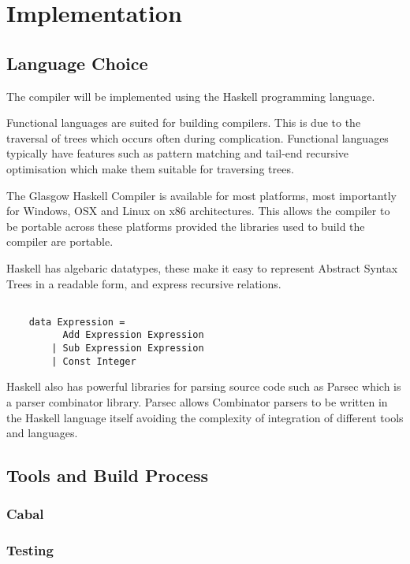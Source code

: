\chapter{Implementation}


\section{Language Choice}

The compiler will be implemented using the Haskell programming language.

Functional languages are suited for building compilers.
This is due to the traversal of trees which occurs often during complication.
Functional languages typically have features such as pattern matching and tail-end recursive optimisation 
which make them suitable for traversing trees.

The Glasgow Haskell Compiler is available for most platforms, most importantly for Windows, OSX and Linux 
on x86 architectures. This allows the compiler to be portable across these platforms provided the libraries 
used to build the compiler are portable.

Haskell has algebaric datatypes, these make it easy to represent Abstract Syntax Trees in a 
readable form, and express recursive relations.

\begin{lstlisting}[style=myHaskell]

    data Expression =
          Add Expression Expression
        | Sub Expression Expression
        | Const Integer

\end{lstlisting}



Haskell also has powerful libraries for parsing source code such as Parsec which is a parser combinator
library. Parsec allows Combinator parsers to be written in the Haskell language itself avoiding the complexity
of integration of different tools and languages. 
\cite{parsec}

\section{Tools and Build Process}

\subsection{Cabal}
\subsection{Testing}
